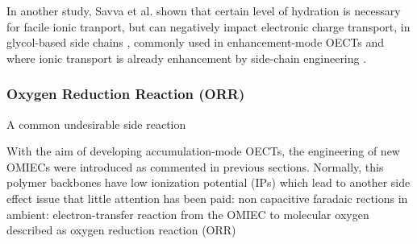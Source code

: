 
In another study, Savva et al. shown that certain level of hydration is necessary for facile ionic tranport, but can negatively impact electronic charge transport, in glycol-based side chains \cite{savvaBalancingIonicElectronic2020}, commonly used in enhancement-mode OECTs and where ionic transport is already enhancement by side-chain engineering \cite{moiaDesignEvaluationConjugated2019}. %


\subsubsection{Oxygen Reduction Reaction (ORR)}

A common undesirable side reaction

With the aim of developing accumulation-mode OECTs, the engineering of new OMIECs were introduced as commented in previous sections. Normally, this polymer backbones have low ionization potential (IPs) which lead to another side effect issue that little attention has been paid: non capacitive faradaic rections in ambient: electron-transfer reaction from the OMIEC to molecular oxygen described as oxygen reduction reaction (ORR)


